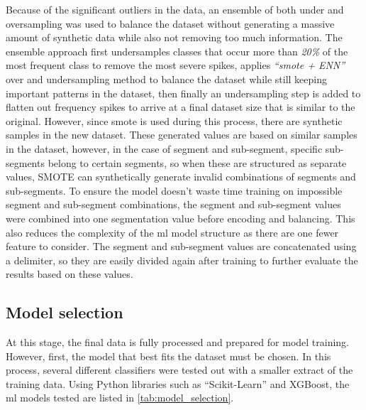 Because of the significant outliers in the data, an ensemble of both under and oversampling was used to balance the dataset without generating a massive amount of synthetic data while also not removing too much information. The ensemble approach first undersamples classes that occur more than \textit{20\%} of the most frequent class to remove the most severe spikes, applies \textit{``\acrshort{smote} + ENN''} over and undersampling method to balance the dataset while still keeping important patterns in the dataset, then finally an undersampling step is added to flatten out frequency spikes to arrive at a final dataset size that is similar to the original. However, since \acrshort{smote} is used during this process, there are synthetic samples in the new dataset. These generated values are based on similar samples in the dataset, however, in the case of segment and sub-segment, specific sub-segments belong to certain segments, so when these are structured as separate values, SMOTE can synthetically generate invalid combinations of segments and sub-segments. To ensure the model doesn't waste time training on impossible segment and sub-segment combinations, the segment and sub-segment values were combined into one segmentation value before encoding and balancing. This also reduces the complexity of the \acrshort{ml} model structure as there are one fewer feature to consider. The segment and sub-segment values are concatenated using a delimiter, so they are easily divided again after training to further evaluate the results based on these values.

\subsection{Model selection}

At this stage, the final data is fully processed and prepared for model training. However, first, the model that best fits the dataset must be chosen. In this process, several different classifiers were tested out with a smaller extract of the training data. Using Python libraries such as ``Scikit-Learn'' and XGBoost, the \acrshort{ml} models tested are listed in \cref{tab:model_selection}.

